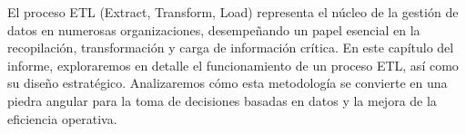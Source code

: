 El proceso ETL (Extract, Transform, Load) representa el núcleo de la gestión de datos en numerosas organizaciones, desempeñando un papel esencial en la recopilación, transformación y carga de información crítica. En este capítulo del informe, exploraremos en detalle el funcionamiento de un proceso ETL, así como su diseño estratégico. Analizaremos cómo esta metodología se convierte en una piedra angular para la toma de decisiones basadas en datos y la mejora de la eficiencia operativa.
